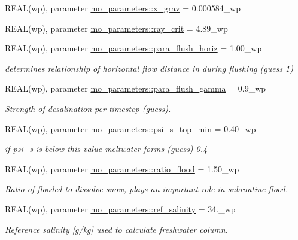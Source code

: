 \begin{DoxyCompactItemize}
REAL(wp), parameter \hyperlink{namespacemo__parameters_a8dd2eb8edab23a209cecbca50873fb83}{mo\_\-parameters::x\_\-grav} = 0.000584\_\-wp
\item 
REAL(wp), parameter \hyperlink{namespacemo__parameters_a5f8c574464740cb0fa35f52e8382500d}{mo\_\-parameters::ray\_\-crit} = 4.89\_\-wp
\item 
REAL(wp), parameter \hyperlink{namespacemo__parameters_af4be8b247f00cf308e1974266c326fdd}{mo\_\-parameters::para\_\-flush\_\-horiz} = 1.00\_\-wp
\begin{DoxyCompactList}\small\item\em determines relationship of horizontal flow distance in during flushing (guess 1) \item\end{DoxyCompactList}\item 
REAL(wp), parameter \hyperlink{namespacemo__parameters_a15fb04a55119c8da15569d72bc5cf370}{mo\_\-parameters::para\_\-flush\_\-gamma} = 0.9\_\-wp
\begin{DoxyCompactList}\small\item\em Strength of desalination per timestep (guess). \item\end{DoxyCompactList}\item 
REAL(wp), parameter \hyperlink{namespacemo__parameters_aad3c0bd73579bfd1abca40b80ed51334}{mo\_\-parameters::psi\_\-s\_\-top\_\-min} = 0.40\_\-wp
\begin{DoxyCompactList}\small\item\em if psi\_\-s is below this value meltwater forms (guess) 0.4 \item\end{DoxyCompactList}\item 
REAL(wp), parameter \hyperlink{namespacemo__parameters_a539e9e515a9154116d2c2f53f4153518}{mo\_\-parameters::ratio\_\-flood} = 1.50\_\-wp
\begin{DoxyCompactList}\small\item\em Ratio of flooded to dissolve snow, plays an important role in subroutine flood. \item\end{DoxyCompactList}\item 
REAL(wp), parameter \hyperlink{namespacemo__parameters_a2ed9bfc96e43a2ccb5fc932c202bcee1}{mo\_\-parameters::ref\_\-salinity} = 34.\_\-wp
\begin{DoxyCompactList}\small\item\em Reference salinity \mbox{[}g/kg\mbox{]} used to calculate freshwater column. \item\end{DoxyCompactList}\item 

\end{DoxyCompactItemize}
